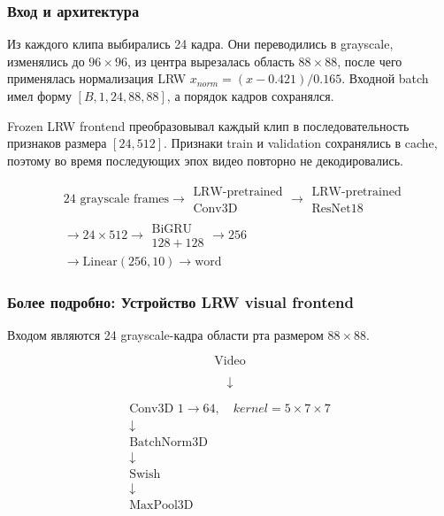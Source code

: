 \documentclass[12pt,a4paper]{article}
\begin{document}
\subsubsection{Вход и архитектура}

Из каждого клипа выбирались 24 кадра. Они переводились в grayscale, изменялись
до $96\times96$, из центра вырезалась область $88\times88$, после чего
применялась нормализация LRW $x_{norm}=(x-0.421)/0.165$. Входной batch имел
форму $[B,1,24,88,88]$, а порядок кадров сохранялся.

Frozen LRW frontend преобразовывал каждый клип в последовательность признаков
размера $[24,512]$. Признаки train и validation сохранялись в cache, поэтому
во время последующих эпох видео повторно не декодировались.

\[
\begin{aligned}
&\boxed{\text{24 grayscale frames}}
\rightarrow
\boxed{
\begin{array}{c}
\text{LRW-pretrained}\\
\text{Conv3D}
\end{array}}
\rightarrow
\boxed{
\begin{array}{c}
\text{LRW-pretrained}\\
\text{ResNet18}
\end{array}}
\\[8pt]
&\rightarrow
\boxed{24\times512}
\rightarrow
\boxed{
\begin{array}{c}
\text{BiGRU}\\
128+128
\end{array}}
\rightarrow
\boxed{256}
\\[8pt]
&\rightarrow
\boxed{\text{Linear}(256,10)}
\rightarrow
\boxed{\text{word}}
\end{aligned}
\]

\iffalse
\subsubsection{Более подробно: Устройство LRW visual frontend}

Входом являются 24 grayscale-кадра области рта размером $88 \times 88$.

\[
\boxed{
\text{Video}
}
\]

\[
\downarrow
\]

\[
\boxed{
\begin{array}{c}
\text{Conv3D } 1 \rightarrow 64,\quad kernel=5\times7\times7 \\
\downarrow \\
\text{BatchNorm3D} \\
\downarrow \\
\text{Swish} \\
\downarrow \\
\text{MaxPool3D}
\end{array}
}
\]
\end{document}
